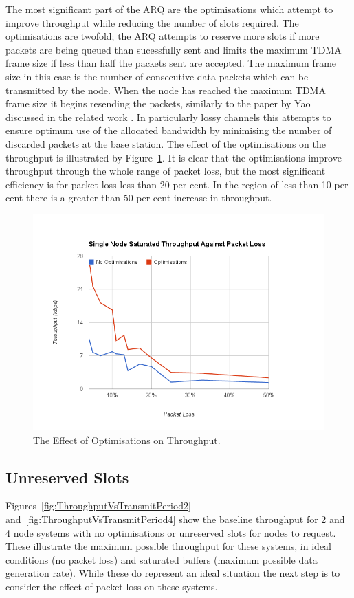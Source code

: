 \documentclass[parskip]{cs4rep}
\begin{document}
The most significant part of the ARQ are the optimisations which attempt to improve throughput while reducing the number of slots required. The optimisations are twofold; the ARQ attempts to reserve more slots if more packets are being queued than sucessfully sent and limits the maximum TDMA frame size if less than half the packets sent are accepted. The maximum frame size in this case is the number of consecutive data packets which can be transmitted by the node. When the node has reached the maximum TDMA frame size it begins resending the packets, similarly to the paper by Yao discussed in the related work \cite{PR6}. In particularly lossy channels this attempts to ensure optimum use of the allocated bandwidth by minimising the number of discarded packets at the base station. The effect of the optimisations on the throughput is illustrated by Figure~\ref{fig:ThroughputVsPacketLossOpt}. It is clear that the optimisations improve throughput through the whole range of packet loss, but the most significant efficiency is for packet loss less than 20 per cent. In the region of less than 10 per cent there is a greater than 50 per cent increase in throughput. 

\begin{figure}
	\centering
	\includegraphics[width=120mm]{throughputvspacketlossopt.png}
	\caption{The Effect of Optimisations on Throughput.}
	\label{fig:ThroughputVsPacketLossOpt}
\end{figure}

\subsection{Unreserved Slots}

Figures~\ref{fig:ThroughputVsTransmitPeriod2} and~\ref{fig:ThroughputVsTransmitPeriod4} show the baseline throughput for 2 and 4 node systems with no optimisations or unreserved slots for nodes to request. These illustrate the maximum possible throughput for these systems, in ideal conditions (no packet loss) and saturated buffers (maximum possible data generation rate). While these do represent an ideal situation the next step is to consider the effect of packet loss on these systems. 
\end{document}
